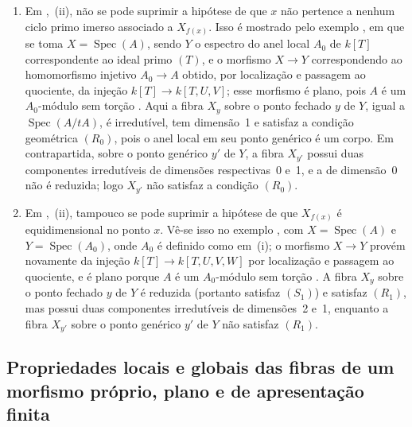 \begin{remarks}[12.1.8]
\label{IV.12.1.8}
\begin{enumerate}[label=(\roman*)]
\item Em ,~(ii), não se pode
suprimir a hipótese de que $x$ não pertence
a nenhum ciclo primo imerso associado a
$X_{f(x)}$. Isso é mostrado pelo exemplo
, em que se toma
$X=\operatorname{Spec}(A)$, sendo $Y$ o espectro
do anel local $A_0$ de $k[T]$ correspondente
ao ideal primo $(T)$, e o morfismo $X\to Y$
correspondendo ao homomorfismo injetivo
$A_0\to A$ obtido, por localização e passagem
ao quociente, da injeção $k[T]\to k[T,U,V]$;
esse morfismo é plano, pois $A$ é um
$A_0$-módulo sem torção .
Aqui a fibra $X_y$ sobre o ponto fechado
$y$ de $Y$, igual a
$\operatorname{Spec}(A/tA)$, é irredutível,
tem dimensão~1 e satisfaz a condição
geométrica $(R_0)$, pois o anel local
em seu ponto genérico é um corpo. Em
contrapartida, sobre o ponto genérico
$y'$ de $Y$, a fibra $X_{y'}$ possui duas
componentes irredutíveis de dimensões
respectivas~0 e~1, e a de dimensão~0
não é reduzida; logo $X_{y'}$ não
satisfaz a condição $(R_0)$.

\item Em ,~(ii), tampouco
se pode suprimir a hipótese de que
$X_{f(x)}$ é equidimensional no ponto
$x$. Vê-se isso no exemplo ,
com $X=\operatorname{Spec}(A)$ e
$Y=\operatorname{Spec}(A_0)$, onde $A_0$
é definido como em~(i); o morfismo
$X\to Y$ provém novamente da injeção
$k[T]\to k[T,U,V,W]$ por localização
e passagem ao quociente, e é plano
porque $A$ é um $A_0$-módulo sem
torção . A fibra
$X_y$ sobre o ponto fechado $y$ de
$Y$ é reduzida (portanto satisfaz
$(S_1)$) e satisfaz $(R_1)$, mas
possui duas componentes irredutíveis
de dimensões~2 e~1, enquanto a
fibra $X_{y'}$ sobre o ponto genérico
$y'$ de $Y$ não satisfaz $(R_1)$.
\end{enumerate}
\end{remarks}

\subsection{Propriedades locais e globais das fibras
de um morfismo próprio, plano e de apresentação finita}
\label{subsection:IV.12.2}

